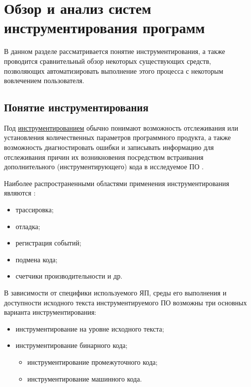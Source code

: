 \chapter{Обзор и анализ систем инструментирования программ}

В данном разделе рассматривается понятие инструментирования, а также проводится сравнительный обзор некоторых существующих средств, позволяющих автоматизировать выполнение этого процесса с некоторым вовлечением пользователя.

\section{Понятие инструментирования}

Под \underline{инструментированием} обычно понимают возможность отслеживания или установления количественных параметров программного продукта, а также возможность диагностировать ошибки и записывать информацию для отслеживания причин их возникновения посредством встраивания дополнительного (инструментирующего) кода в исследуемое ПО \cite{lomakina2016testirovanie}.

Наиболее распространенными областями применения инструментирования являются \cite{instrumentiruieto}:

\begin{itemize}[noitemsep]
  \item трассировка;
  \item отладка;
  \item регистрация событий;
  \item подмена кода;
  \item счетчики производительности и др.
\end{itemize}

В зависимости от специфики используемого ЯП, среды его выполнения и доступности исходного текста инструментируемого ПО возможны три основных варианта инструментирования:

\begin{itemize}[noitemsep]
  \item инструментирование на уровне исходного текста;
  \item инструментирование бинарного кода;
  \begin{itemize}[noitemsep]
    \item инструментирование промежуточного кода;
    \item инструментирование машинного кода.
  \end{itemize}
\end{itemize}

